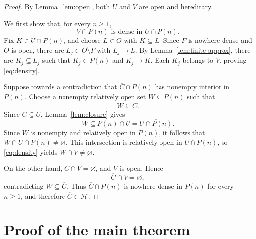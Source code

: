 \documentclass[11pt]{amsart}
\theoremstyle{remark}
\newcommand{\HH}{\mathcal H}
\newcommand{\cl}[1]{\overline{#1}}
\begin{document}
\begin{proof}
By Lemma~\ref{lem:open}, both $U$ and $V$ are open and hereditary.

We first show that, for every $n\geq1$,
\begin{equation}\label{eq:density}
V\cap P(n)\text{ is dense in }U\cap P(n).
\end{equation}
Fix $K\in U\cap P(n)$, and choose $L\in O$ with $K\subseteq L$.
Since $F$ is nowhere dense and $O$ is open, there are
$L_j\in O\setminus F$ with $L_j\to L$. By
Lemma~\ref{lem:finite-approx}, there are $K_j\subseteq L_j$ such that
$K_j\in P(n)$ and $K_j\to K$. Each $K_j$ belongs to $V$, proving
\eqref{eq:density}.

Suppose towards a contradiction that $\cl C\cap P(n)$ has nonempty
interior in $P(n)$. Choose a nonempty relatively open set
$W\subseteq P(n)$ such that
\[
W\subseteq\cl C.
\]
Since $C\subseteq U$, Lemma~\ref{lem:closure} gives
\[
W\subseteq P(n)\cap\cl U=\cl{U\cap P(n)}.
\]
Since $W$ is nonempty and relatively open in $P(n)$, it follows that
$W\cap U\cap P(n)\neq\varnothing$. This intersection is relatively open
in $U\cap P(n)$, so \eqref{eq:density} yields $W\cap V\neq\varnothing$.

On the other hand, $C\cap V=\varnothing$, and $V$ is open. Hence
\[
\cl C\cap V=\varnothing,
\]
contradicting $W\subseteq\cl C$. Thus $\cl C\cap P(n)$ is nowhere
dense in $P(n)$ for every $n\geq1$, and therefore $\cl C\in\HH$.
\end{proof}

\section{Proof of the main theorem}
\end{document}

